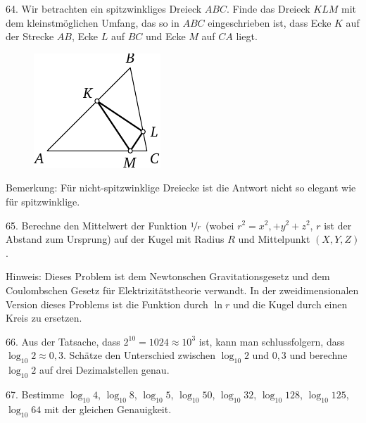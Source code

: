 \begin{problem}{64.}
	Wir betrachten ein spitzwinkliges Dreieck $ABC$. Finde das Dreieck $KLM$ mit dem kleinstmöglichen Umfang, das so in $ABC$ eingeschrieben ist, dass Ecke $K$ auf der Strecke $AB$, Ecke $L$ auf $BC$ und Ecke $M$ auf $CA$ liegt.
	\begin{figure}
		\includegraphics{resources/taskbook-48}
	\end{figure}

	\begin{note}{Bemerkung:}
		Für nicht-spitzwinklige Dreiecke ist die Antwort nicht so elegant wie für spitzwinklige.
	\end{note}
\end{problem}

\begin{problem}{65.}
	Berechne den Mittelwert der Funktion $\nicefrac{1}{r}$ (wobei $r^2 =x^2,+y^2+z^2$, $r$ ist der Abstand zum Ursprung)  auf der Kugel mit Radius $R$ und Mittelpunkt $(X,Y,Z)$.

	\begin{note}{Hinweis:}
		Dieses Problem ist dem Newtonschen Gravitationsgesetz und dem Coulombschen Gesetz für Elektrizitätstheorie verwandt. In der zweidimensionalen Version dieses Problems ist die Funktion durch $\ln r$ und die Kugel durch einen Kreis zu ersetzen.
	\end{note}
\end{problem}

\begin{problem}{66.}
	Aus der Tatsache, dass $2^{10}=1024 \approx 10^3$ ist, kann man schlussfolgern, dass $\log_{10} 2 \approx 0,3$. Schätze den Unterschied zwischen $\log_{10} 2$ und $0,3$ und berechne $\log_{10} 2$ auf drei Dezimalstellen genau.
\end{problem}

\begin{problem}{67.}
	Bestimme $\log_{10} 4$, $\log_{10} 8$, $\log_{10} 5$, $\log_{10} 50$, $\log_{10} 32$, $\log_{10} 128$, $\log_{10} 125$, $\log_{10} 64$ mit der gleichen Genauigkeit.
\end{problem}

